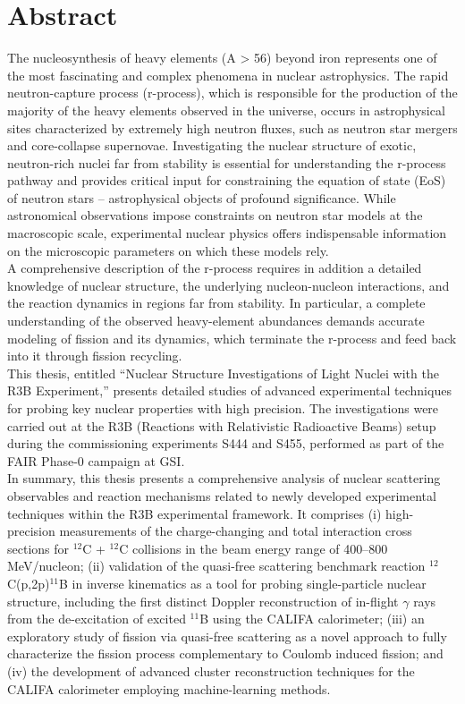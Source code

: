 \thispagestyle{empty}
\section*{Abstract}

The nucleosynthesis of heavy elements (A > 56) beyond iron represents one of the most fascinating and complex phenomena in nuclear astrophysics. The rapid neutron-capture process (r-process), which is responsible for the production of the majority of the heavy elements observed in the universe, occurs in astrophysical sites characterized by extremely high neutron fluxes, such as neutron star mergers and core-collapse supernovae. Investigating the nuclear structure of exotic, neutron-rich nuclei far from stability is essential for understanding the r-process pathway and provides critical input for constraining the equation of state (EoS) of neutron stars -- astrophysical objects of profound significance. While astronomical observations impose constraints on neutron star models at the macroscopic scale, experimental nuclear physics offers indispensable information on the microscopic parameters on which these models rely.\\
A comprehensive description of the r-process requires in addition a detailed knowledge of nuclear structure, the underlying nucleon-nucleon interactions, and the reaction dynamics in regions far from stability. In particular, a complete understanding of the observed heavy-element abundances demands accurate modeling of fission and its dynamics, which terminate the r-process and feed back into it through fission recycling.\\
This thesis, entitled “Nuclear Structure Investigations of Light Nuclei with the R3B Experiment,” presents detailed studies of advanced experimental techniques for probing key nuclear properties with high precision. The investigations were carried out at the R3B (Reactions with Relativistic Radioactive Beams) setup during the commissioning experiments S444 and S455, performed as part of the FAIR Phase-0 campaign at GSI.\\
In summary, this thesis presents a comprehensive analysis of nuclear scattering observables and reaction mechanisms related to newly developed experimental techniques within the R3B experimental framework. It comprises (i) high-precision measurements of the charge-changing and total interaction cross sections for $^{12}$C + $^{12}$C collisions in the beam energy range of 400–800 MeV/nucleon; (ii) validation of the quasi-free scattering benchmark reaction $^{12}$C(p,2p)$^{11}$B in inverse kinematics as a tool for probing single-particle nuclear structure, including the first distinct Doppler reconstruction of in-flight $\gamma$ rays from the de-excitation of excited $^{11}$B using the CALIFA calorimeter; (iii) an exploratory study of fission via quasi-free scattering as a novel approach to fully characterize the fission process complementary to Coulomb induced fission; and (iv) the development of advanced cluster reconstruction techniques for the CALIFA calorimeter employing machine-learning methods.\\
